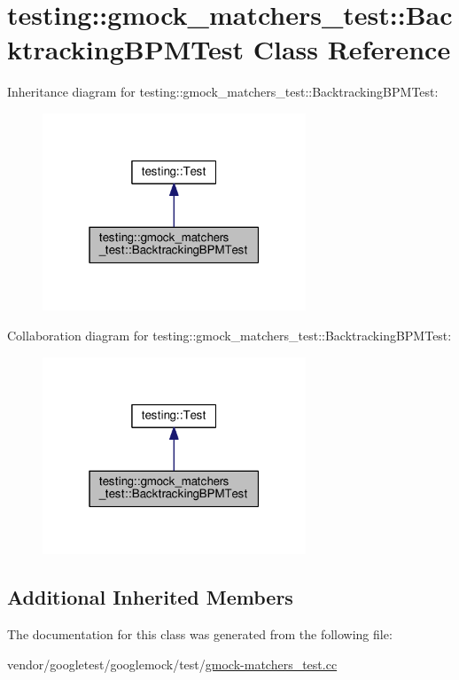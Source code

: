\hypertarget{classtesting_1_1gmock__matchers__test_1_1BacktrackingBPMTest}{}\section{testing\+:\+:gmock\+\_\+matchers\+\_\+test\+:\+:Backtracking\+B\+P\+M\+Test Class Reference}
\label{classtesting_1_1gmock__matchers__test_1_1BacktrackingBPMTest}


Inheritance diagram for testing\+:\+:gmock\+\_\+matchers\+\_\+test\+:\+:Backtracking\+B\+P\+M\+Test\+:\nopagebreak
\begin{figure}[H]
\begin{center}
\leavevmode
\includegraphics[width=223pt]{classtesting_1_1gmock__matchers__test_1_1BacktrackingBPMTest__inherit__graph}
\end{center}
\end{figure}


Collaboration diagram for testing\+:\+:gmock\+\_\+matchers\+\_\+test\+:\+:Backtracking\+B\+P\+M\+Test\+:\nopagebreak
\begin{figure}[H]
\begin{center}
\leavevmode
\includegraphics[width=223pt]{classtesting_1_1gmock__matchers__test_1_1BacktrackingBPMTest__coll__graph}
\end{center}
\end{figure}
\subsection*{Additional Inherited Members}


The documentation for this class was generated from the following file\+:\begin{DoxyCompactItemize}
\item 
vendor/googletest/googlemock/test/\hyperlink{gmock-matchers__test_8cc}{gmock-\/matchers\+\_\+test.\+cc}\end{DoxyCompactItemize}
